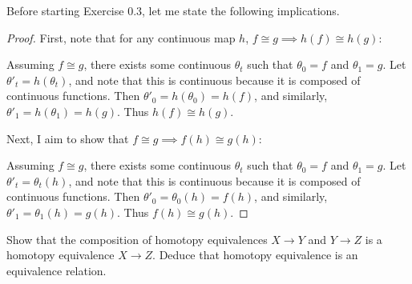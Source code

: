 \documentclass[12pt]{article}
\newenvironment{statement}[2][Statement]{\begin{trivlist}
\item[\hskip \labelsep {\bfseries #1}\hskip \labelsep {\bfseries #2.}]}{\end{trivlist}}
\begin{document}
\begin{statement}[Exercise]{0.3}
    Before starting Exercise 0.3, let me state the following implications.    
\end{statement}
\begin{proof}
    First, note that for any continuous map $h$, $f \cong g \implies h(f) \cong h(g)$:
    \par Assuming $f \cong g$, there exists some continuous $\theta_t$ such that $\theta_0=f$ and $\theta_1=g$. Let $\theta'_t=h(\theta_t)$, and note that this is continuous because it is composed of continuous functions. Then $\theta'_0=h(\theta_0)=h(f)$, and similarly, $\theta'_1=h(\theta_1)=h(g)$. Thus $h(f) \cong h(g)$.
    \par Next, I aim to show that $f \cong g \implies f(h) \cong g(h)$:
    \par Assuming $f \cong g$, there exists some continuous $\theta_t$ such that $\theta_0=f$ and $\theta_1=g$. Let $\theta'_t=\theta_t(h)$, and note that this is continuous because it is composed of continuous functions. Then $\theta'_0=\theta_0(h)=f(h)$, and similarly, $\theta'_1=\theta_1(h)=g(h)$. Thus $f(h) \cong g(h)$.
\end{proof}
\begin{statement}[Exercise]{0.3a}
        Show that the composition of homotopy equivalences $X \to Y$ and $Y \to Z$ is a homotopy equivalence $X \to Z$. Deduce that homotopy equivalence is an equivalence relation.
\end{statement}
\end{document}
